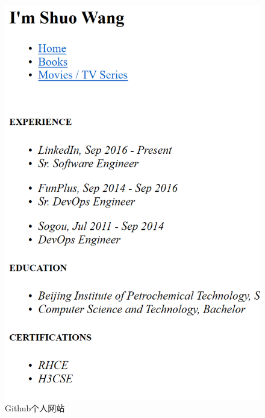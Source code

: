 \documentclass{article}
\begin{document}
\begin{figure}[h!]
	\centering
	\includegraphics[scale=0.4]{20191127224007}
	\caption{Github个人网站}
	\label{fig:ggrqc.jpg}
\end{figure}
\end{document}
